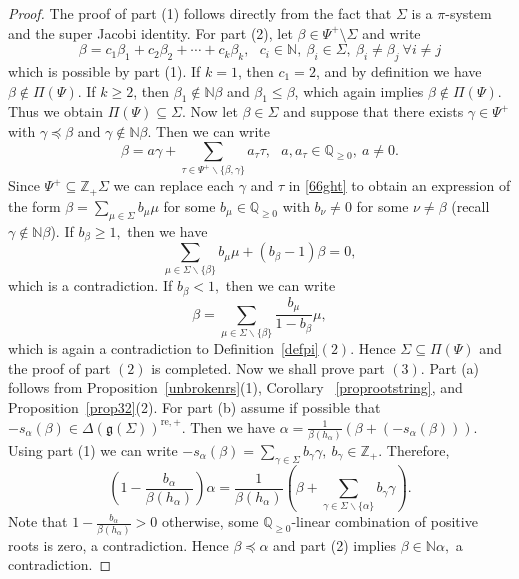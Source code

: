 \documentclass[11pt,reqno]{amsart}
\theoremstyle{plain}
\theoremstyle{definition}
\theoremstyle{remark}
\newcommand{\lie}[1]{\mathfrak{#1}}
\newcommand\bn{\mathbb N}
\newcommand\bz{\mathbb Z}
\numberwithin{equation}{section}
\begin{document}
\begin{proof}
The proof of part (1) follows directly from the fact that $\Sigma$ is a $\pi$-system and the super Jacobi identity. 
For part (2), let $\beta \in \Psi^{+} \setminus \Sigma$ and write
$$\beta=c_1\beta_1+c_2\beta_2+\cdots+c_k\beta_k,\ \ \ c_i\in \bn,\ \beta_i\in \Sigma,\ \beta_i\neq \beta_j\  \forall i\neq j$$ 
which is possible by part (1). If $k=1$, then $c_1 = 2$, and by definition we have $\beta \notin \Pi(\Psi)$.
If $k \ge 2$, then $\beta_1 \notin \mathbb{N}\beta$ and $\beta_1 \le \beta$, which again implies $\beta \notin \Pi(\Psi)$.
Thus we obtain $\Pi(\Psi) \subseteq \Sigma$.
Now let $\beta \in \Sigma$ and suppose that there exists $\gamma \in \Psi^{+}$ with $\gamma\preceq \beta$ and $\gamma\notin \bn  \beta$. Then we can write
\begin{equation}\label{66ght}\beta=a\gamma+\sum_{\tau\in \Psi^+\backslash\{\beta,\gamma\}}a_\tau \tau,\ \ \ a,a_\tau\in \mathbb{Q}_{\geq 0},\ a\neq 0.\end{equation} Since $\Psi^+\subseteq \bz_+\Sigma$ we can replace each $\gamma$ and $\tau$ in \eqref{66ght} to obtain an expression of the form
$\beta=\sum_{\mu\in \Sigma} b_\mu \mu$ for some $b_\mu\in\mathbb{Q}_{\geq 0}$ with $b_\nu\neq 0$ for some $\nu\neq \beta$ (recall $\gamma\notin\bn\beta$). If $b_\beta\geq 1,$ then we have $$\sum_{\mu\in \Sigma\backslash\{\beta\}}b_\mu \mu+(b_\beta-1)\beta=0,$$ which is a contradiction. If $b_\beta<1,$ then we can write $$\beta=\sum_{\mu\in \Sigma\backslash\{\beta\}}\frac{b_\mu}{1-b_\beta} \mu,$$ which is again a contradiction to Definition~\ref{defpi}$(2)$. Hence $\Sigma\subseteq \Pi(\Psi)$ and the proof of part $(2)$ is completed.
Now we shall prove part $(3).$ Part (a) follows from Proposition~\ref{unbrokenrs}(1), Corollary ~\ref{proprootstring}, and Proposition~\ref{prop32}(2). For part (b) assume if possible that $-s_\alpha(\beta)\in \Delta(\lie g(\Sigma))^{\mathrm{re},+}.$ Then we have $\alpha=\frac{1}{\beta(h_\alpha)}(\beta+(-s_\alpha(\beta))).$ Using part (1) we can write $-s_\alpha(\beta)=\sum_{\gamma\in \Sigma}b_\gamma\gamma,\ b_\gamma\in\bz_+.$ Therefore, $$\left(1-\frac{b_\alpha}{\beta(h_\alpha)}\right)\alpha=\frac{1}{\beta(h_\alpha)}\left(\beta+\sum_{\gamma\in \Sigma\backslash\{\alpha\}} b_\gamma\gamma\right).$$
Note that $1-\frac{b_\alpha}{\beta(h_\alpha)}>0$ otherwise, some $\mathbb{Q}_{\geq 0}$-linear combination of positive roots is zero, a contradiction. Hence $\beta\preceq \alpha$ and part (2) implies $\beta\in\bn\alpha,$ a contradiction.
\end{proof}
\end{document}
